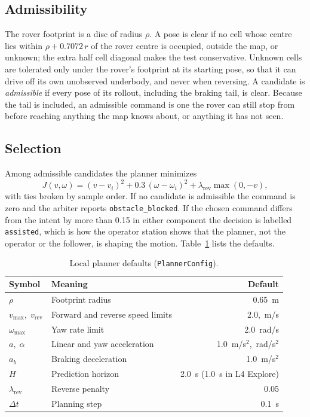 \subsection{Admissibility}

The rover footprint is a disc of radius $\rho$.
A pose is clear if no cell whose centre lies within $\rho + 0.7072\,r$ of the rover centre is occupied, outside the map, or unknown; the extra half cell diagonal makes the test conservative.
Unknown cells are tolerated only under the rover's footprint at its starting pose, so that it can drive off its own unobserved underbody, and never when reversing.
A candidate is \emph{admissible} if every pose of its rollout, including the braking tail, is clear.
Because the tail is included, an admissible command is one the rover can still stop from before reaching anything the map knows about, or anything it has not seen.

\subsection{Selection}

Among admissible candidates the planner minimizes
\begin{equation}
  J(v, \omega) = (v - v_i)^2 + 0.3\,(\omega - \omega_i)^2 + \lambda_{\text{rev}}\max(0, -v),
  \label{eq:planner-cost}
\end{equation}
with ties broken by sample order.
If no candidate is admissible the command is zero and the arbiter reports \texttt{obstacle\_blocked}.
If the chosen command differs from the intent by more than 0.15 in either component the decision is labelled \texttt{assisted}, which is how the operator station shows that the planner, not the operator or the follower, is shaping the motion.
Table~\ref{tab:planner} lists the defaults.

\begin{table}[ht]
\centering
\caption{Local planner defaults (\texttt{PlannerConfig}).}
\label{tab:planner}
\begin{tabular}{@{}l l r@{}}
\toprule
Symbol & Meaning & Default \\
\midrule
$\rho$ & Footprint radius & 0.65~m \\
$v_{\max},\; v_{\text{rev}}$ & Forward and reverse speed limits & 2.0,\; 0.15~m/s \\
$\omega_{\max}$ & Yaw rate limit & 2.0~rad/s \\
$a,\; \alpha$ & Linear and yaw acceleration & 1.0~m/s$^2$,\; 2.0~rad/s$^2$ \\
$a_b$ & Braking deceleration & 1.0~m/s$^2$ \\
$H$ & Prediction horizon & 2.0~s (1.0~s in L4 Explore) \\
$\lambda_{\text{rev}}$ & Reverse penalty & 0.05 \\
$\Delta t$ & Planning step & 0.1~s \\
\bottomrule
\end{tabular}
\end{table}

